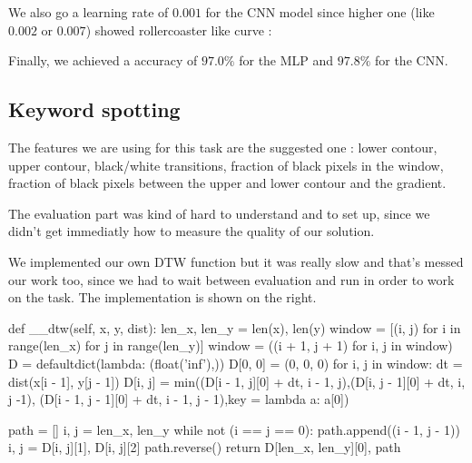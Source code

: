\documentclass[a4paper,11pt]{report}
\begin{document}
We also go a learning rate of $0.001$ for the CNN model since higher one (like
$0.002$ or $0.007$) showed rollercoaster like curve :

\vspace*{0.2cm}

\begin{minipage}{0.49\textwidth}
  \begin{center}
  \end{center}
\end{minipage}
\begin{minipage}{0.49\textwidth}
Finally, we achieved a accuracy of $97.0\%$ for the MLP and $97.8\%$ for the CNN.
\end{minipage}

\subsection*{Keyword spotting}

The features we are using for this task are the suggested one : lower contour, upper
contour, black/white transitions, fraction of black pixels in the window,
fraction of black pixels between the upper and lower contour and the gradient.

The evaluation part was kind of hard to understand and to set up, since we
didn't get immediatly how to measure the quality of our solution.

We implemented our own DTW function but it was really slow and that's messed our
work too, since we had to wait between evaluation and run in order to work on
the task. The implementation is shown on the right.
\begin{pythoncode}
def __dtw(self, x, y, dist):
  len_x, len_y = len(x), len(y)
  window = [(i, j) for i in range(len_x) for j in range(len_y)]
  window = ((i + 1, j + 1) for i, j in window)
  D = defaultdict(lambda: (float('inf'),))
  D[0, 0] = (0, 0, 0)
  for i, j in window:
    dt = dist(x[i - 1], y[j - 1])
    D[i, j] = min((D[i - 1, j][0] + dt, i - 1, j),(D[i, j - 1][0] + dt, i, j -1),
    (D[i - 1, j - 1][0] + dt, i - 1, j - 1),key = lambda a: a[0])

  path = []
  i, j = len_x, len_y
  while not (i == j == 0):
    path.append((i - 1, j - 1))
    i, j = D[i, j][1], D[i, j][2]
  path.reverse()
  return D[len_x, len_y][0], path
\end{pythoncode}
\end{document}
